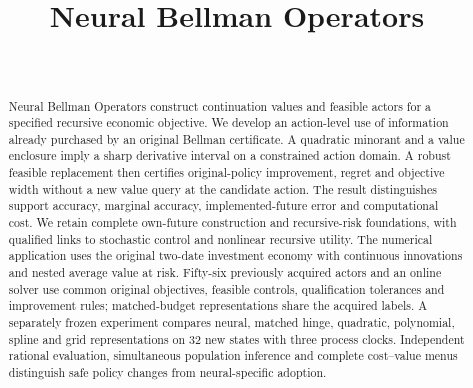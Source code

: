 \documentclass[ecta,nameyear,draft]{econsocart}
\begin{document}
\begin{frontmatter}
\title{Neural Bellman Operators}
\begin{aug}
\author[id=au1,addressref={add1}]{~}
\address[id=add1]{Peking University}
\end{aug}
\begin{abstract}
Neural Bellman Operators construct continuation values and feasible actors for a
specified recursive economic objective. We develop an action-level use of
information already purchased by an original Bellman certificate. A quadratic
minorant and a value enclosure imply a sharp derivative interval on a constrained
action domain. A robust feasible replacement then certifies original-policy
improvement, regret and objective width without a new value query at the
candidate action. The result distinguishes support accuracy, marginal accuracy,
implemented-future error and computational cost. We retain complete own-future
construction and recursive-risk foundations, with qualified links to stochastic
control and nonlinear recursive utility. The numerical application uses the
original two-date investment economy with continuous innovations and nested
average value at risk. Fifty-six previously acquired actors and an online solver use common original
objectives, feasible controls, qualification tolerances and improvement rules;
matched-budget representations share the acquired labels. A separately
frozen experiment compares neural, matched hinge, quadratic, polynomial,
spline and grid representations on 32 new states with three process clocks.
Independent rational evaluation, simultaneous population inference and complete
cost--value menus distinguish safe policy changes from neural-specific adoption.
\end{abstract}
\begin{keyword}
\end{keyword}
\end{frontmatter}










\begingroup
\let\NBOBibliographyStart\thebibliography
\renewcommand{\thebibliography}[1]{\NBOBibliographyStart{#1}\raggedright}

\endgroup
\end{document}
